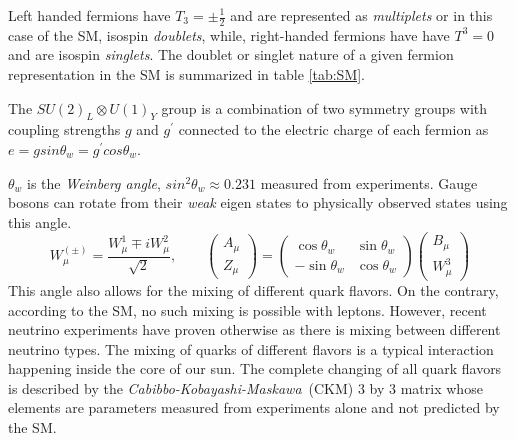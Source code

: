 Left handed fermions have $T_{3} = \pm \frac{1}{2}$ and are represented as \textit{multiplets } or in this case of the SM, isospin \textit{doublets},  while, right-handed fermions have have $T^{3} = 0$ and are isospin \textit{singlets}. The doublet or singlet nature of a given fermion representation in the SM is summarized in table \ref{tab:SM}.


The $SU(2)_{L} \otimes U(1)_{Y}$ group is a combination of two symmetry groups with coupling strengths $g$ and $g^{\prime}$ connected to the electric charge of each fermion as $e = g sin \theta_{w} = g^{\prime} cos \theta_{w}$.


$\theta_{w}$ is the \textit{Weinberg angle}, $sin^{2}\theta_{w} \approx 0.231$ measured from experiments.
Gauge bosons can rotate from their \textit{weak} eigen states to physically observed states using this angle.
\begin{equation}
 W^{(\pm)}_{\mu} = \frac{W^{1}_{\mu} \mp i W^{2}_{\mu}}{\sqrt{2}}, \quad \quad 
 {\begin{pmatrix} A_{\mu} \\ Z_{\mu}  \end{pmatrix} } = {\begin{pmatrix}  \cos{\theta_{w}} & \sin{\theta_{w}} \\ -\sin{\theta_{w}} & \cos{\theta_{w}}   \end{pmatrix}}  {\begin{pmatrix} B_{\mu} \\ W^{3}_{\mu} \end{pmatrix} }
\end{equation}
This angle also allows for the mixing of different quark flavors. On the contrary, according to the SM, no such mixing is possible with leptons. However, recent neutrino experiments have proven otherwise as there is mixing between different neutrino types. The mixing of quarks of different flavors is a typical interaction happening inside the core of our sun. The complete changing of all quark flavors is described by the \textit{Cabibbo-Kobayashi-Maskawa}~(CKM) 3 by 3 matrix whose elements are parameters measured from experiments alone and not predicted by the SM.
